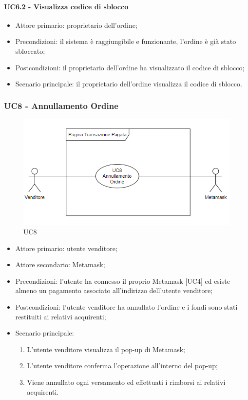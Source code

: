 \paragraph{UC6.2 - Visualizza codice di sblocco}

\begin{itemize}
    \item Attore primario: proprietario dell'ordine;
    \item Precondizioni: il sistema è raggiungibile e funzionante, l'ordine è già stato sbloccato;
    \item Postcondizioni: il proprietario dell'ordine ha visualizzato il codice di sblocco;
    \item Scenario principale: il proprietario dell'ordine visualizza il codice di sblocco.
\end{itemize}

\subsubsection{UC8 - Annullamento Ordine}

\begin{figure}[H]
    \centering
    \includegraphics[scale=0.8]{immagini/UC8.png}
    \caption{UC8}
\end{figure}

\begin{itemize}
    \item Attore primario: utente venditore;
    \item Attore secondario: Metamask\glo{};
    \item Precondizioni: l'utente ha connesso il proprio Metamask\glo{} [UC4] ed esiste almeno un pagamento associato all'indirizzo dell'utente venditore;
    \item Postcondizioni: l'utente venditore ha annullato l'ordine e i fondi sono stati restituiti ai relativi acquirenti;
    \item Scenario principale:
          \begin{enumerate}
              \item L'utente venditore visualizza il pop-up di Metamask\glo{};
              \item L'utente venditore conferma l'operazione all'interno del pop-up;
              \item Viene annullato ogni versamento ed effettuati i rimborsi ai relativi acquirenti.
          \end{enumerate}
\end{itemize}

